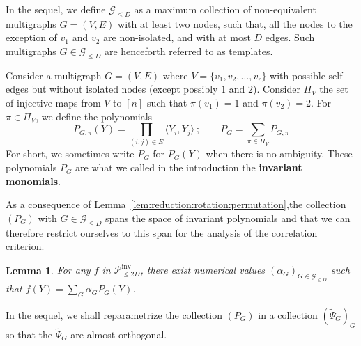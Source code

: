 \documentclass{article}
\newtheorem{lemma}{Lemma}
\begin{document}
\medskip 



In the sequel, we define $\mathcal{G}_{\leq D}$ as a maximum collection of non-equivalent multigraphs $G=(V,E)$ with at least two nodes, such that, all the nodes to the exception of $v_1$ and $v_2$ are non-isolated, and with at most $D$ edges. Such multigraphs $G\in \mathcal{G}_{\leq D}$ are henceforth referred to as templates. 






\bigskip 

Consider a multigraph $G= (V,E)$ where $V=\{v_1,v_2,\ldots, v_r\}$ with possible self edges but without isolated nodes (except possibly $1$ and $2$). Consider $\Pi_V$ the set of injective maps from  $V$ to $[n]$ such that $\pi(v_1)=1$ and $\pi(v_2)=2$. For $\pi\in \Pi_V$, we define the polynomials
\begin{equation}\label{eq:definition:P_G}
P_{G,\pi}(Y)= \prod_{(i,j)\in E} \langle Y_i,Y_{j}\rangle\ ; \quad \quad P_G = \sum_{\pi\in \Pi_V} P_{G,\pi}
\end{equation}
For short, we sometimes write $P_G$ for $P_G(Y)$ when there is no ambiguity. These polynomials $P_G$ are what we called in the introduction the {\bf invariant monomials}. 


As a consequence of Lemma~\ref{lem:reduction:rotation:permutation},the collection $(P_{G})$ with $G\in \mathcal{G}_{\leq D}$ spans the space of invariant polynomials and that we can therefore restrict ourselves to this span for the analysis of the correlation criterion.
\begin{lemma}\label{lem:invariant:graph}
 For any $f$ in $\mathcal{P}^{\mathrm{inv}}_{\leq 2D}$, there exist numerical values $(\alpha_{G})_{G \in \mathcal G_{\leq D}}$ such that $f(Y)=\sum_{G} \alpha_G P_G(Y)$.
\end{lemma}


In the sequel, we shall reparametrize  the collection $(P_G)$ in a collection $(\widetilde{\Psi}_G)_G$ so that the $\widetilde{\Psi}_G$ are almost orthogonal. 
\end{document}
